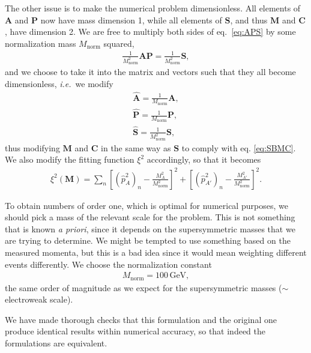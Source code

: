 \documentclass[twoside,english]{uiofysmaster}
\begin{document}
The other issue is to make the numerical problem dimensionless. All elements of $\mathbf{A}$ and $\mathbf{P}$ now have mass dimension 1, while all elements of $\mathbf{S}$, and thus $\mathbf{M}$ and $\mathbf{C}$, have dimension 2. We are free to multiply both sides of eq.\ \eqref{eq:APS} by some normalization mass $M_\mathrm{norm}$ squared,
\begin{align}
	\frac{1}{M_\mathrm{norm}^2} \mathbf{A}\mathbf{P} = \frac{1}{M_\mathrm{norm}^2} \mathbf{S},
\end{align}
and we choose to take it into the matrix and vectors such that they all become dimensionless, {\it i.e.}\ we modify
\begin{align}
	\mathbf{\hat A} = \frac{1}{M_\mathrm{norm}}\mathbf{A},\nonumber \\
	\mathbf{\hat P} = \frac{1}{M_\mathrm{norm}}\mathbf{P},\label{eq:vectors_normalized}\\
	\mathbf{\hat S} = \frac{1}{M_\mathrm{norm}^2}\mathbf{S},\nonumber 
\end{align}
thus modifying $\mathbf{M}$ and $\mathbf{C}$ in the same way as $\mathbf{S}$ to comply with eq. \eqref{eq:SBMC}. We also modify the fitting function $\xi^2$ accordingly, so that it becomes
\begin{align}
	\xi^2(\mathbf{M}) = \sum_n \left[(\hat p_{A}^2)_n - \frac{M_A^2}{M_\mathrm{norm}^2}\right]^2 + \left[(\hat p_{A'}^2)_n - \frac{M_{A'}^2}{M_\mathrm{norm}^2}\right]^2.\label{eq:xisquared_modified}
\end{align}

To obtain numbers of order one, which is optimal for numerical purposes, we should pick a mass of the relevant scale for the problem. This is not something that is known {\it a priori}, since it depends on the supersymmetric masses that we are trying to determine. We might be tempted to use something based on the measured momenta, but this is a bad idea since it would mean weighting different events differently. We choose the normalization constant
\begin{align}
	M_\mathrm{norm} = 100 \,\mathrm{GeV},
\end{align}
the same order of magnitude as we expect for the supersymmetric masses ($\sim$ electroweak scale). 

We have made thorough checks that this formulation and the original one produce identical results within numerical accuracy, so that indeed the formulations are equivalent.
\end{document}
